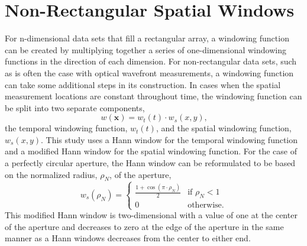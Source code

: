\section{Non-Rectangular Spatial Windows}
For n-dimensional data sets that fill a rectangular array, a windowing function can be created by multiplying together a series of one-dimensional windowing functions in the direction of each dimension.
For non-rectangular data sets, such as is often the case with optical wavefront measurements, a windowing function can take some additional steps in its construction.
In cases when the spatial measurement locations are constant throughout time, the windowing function can be split into two separate components,
\begin{equation}
 w(\mathbf{x}) = w_t(t)\cdot w_s(x,y) \textrm{,}
 \label{eqn:04_window_sep}
\end{equation}
the temporal windowing function, $w_t(t)$, and the spatial windowing function, $w_s(x,y)$.
This study uses a Hann window for the temporal windowing function and a modified Hann window for the spatial windowing function.
For the case of a perfectly circular aperture, the Hann window can be reformulated to be based on the normalized radius, $\rho_N$, of the aperture,
\begin{equation}
 w_s(\rho_N) =
 \begin{cases}
  \frac{1+\cos(\pi\cdot\rho_N)}{2} & \textrm{if } \rho_N < 1 \\
  0                                & \textrm{otherwise.}
 \end{cases}
 \label{eqn:04_window_space}
\end{equation}
This modified Hann window is two-dimensional with a value of one at the center of the aperture and decreases to zero at the edge of the aperture in the same manner as a Hann windows decreases from the center to either end.

